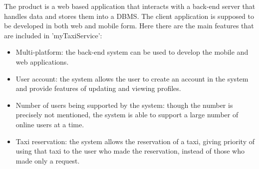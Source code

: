 The product is a web based application that interacts with a back-end server that handles data and stores them into a DBMS.
The client application is supposed to be developed in both web and mobile form.
Here there are the main features that are included in 'myTaxiService':
\begin{itemize}
    \item Multi-platform: the back-end system can be used to develop the mobile and web applications.
    \item User account: the system allows the user to create an account in the system and provide features of updating and viewing profiles.
    \item Number of users being supported by the system: though the number is precisely not mentioned, the system is able to support a large number of online users at a time.
    \item Taxi reservation: the system allows the reservation of a taxi, giving priority of using that taxi to the user  who made the reservation, instead of those who made only a request.
\end{itemize}